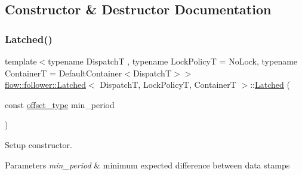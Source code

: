 \subsection{Constructor \& Destructor Documentation}
\mbox{\label{classflow_1_1follower_1_1_latched_ac2744bb4d4e1f91474d7d801cb3f716d}} 
\subsubsection{\texorpdfstring{Latched()}{Latched()}\hspace{0.1cm}{\footnotesize\ttfamily [1/2]}}
{\footnotesize\ttfamily template$<$typename DispatchT , typename Lock\+PolicyT  = No\+Lock, typename ContainerT  = Default\+Container$<$\+Dispatch\+T$>$$>$ \\
\hyperlink{classflow_1_1follower_1_1_latched}{flow\+::follower\+::\+Latched}$<$ DispatchT, Lock\+PolicyT, ContainerT $>$\+::\hyperlink{classflow_1_1follower_1_1_latched}{Latched} (\begin{DoxyParamCaption}\item[{const \hyperlink{classflow_1_1follower_1_1_latched_ae30442baa432fd3784ecc5199ddcfeb2}{offset\+\_\+type}}]{min\+\_\+period }\end{DoxyParamCaption})}



Setup constructor. 


\begin{DoxyParams}{Parameters}
{\em min\+\_\+period} & minimum expected difference between data stamps \\
\hline
\end{DoxyParams}
\mbox{\label{classflow_1_1follower_1_1_latched_a8b4fb76009a6cead726789c79a2eb2fa}} 
